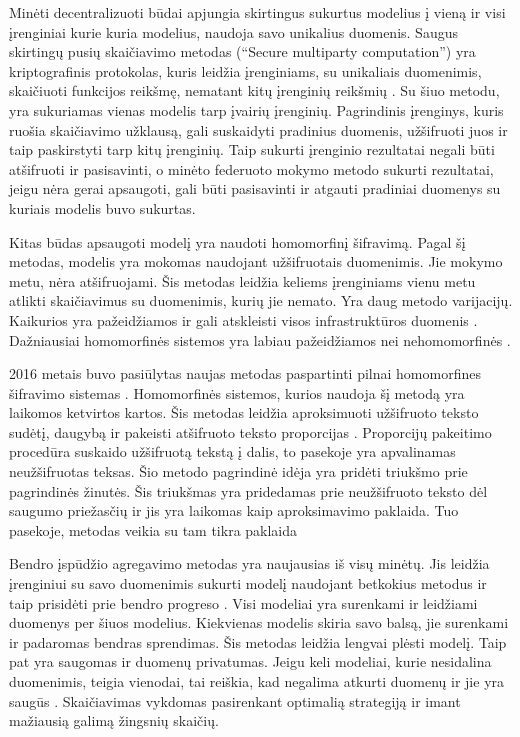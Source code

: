 \documentclass{VUMIFInfBakalaurinis}
\begin{document}
\par Minėti decentralizuoti būdai apjungia skirtingus sukurtus modelius į vieną ir visi įrenginiai kurie kuria modelius, naudoja savo unikalius duomenis. Saugus skirtingų pusių skaičiavimo metodas (\enquote{Secure multiparty computation}) yra kriptografinis protokolas, kuris leidžia įrenginiams, su unikaliais duomenimis, skaičiuoti funkcijos reikšmę, nematant kitų įrenginių reikšmių \cite{6}. Su šiuo metodu, yra sukuriamas vienas modelis tarp įvairių įrenginių. Pagrindinis įrenginys, kuris ruošia skaičiavimo užklausą, gali suskaidyti pradinius duomenis, užšifruoti juos ir taip paskirstyti tarp kitų įrenginių. Taip sukurti įrenginio rezultatai negali būti atšifruoti ir pasisavinti, o minėto federuoto mokymo metodo sukurti rezultatai, jeigu nėra gerai apsaugoti, gali būti pasisavinti ir atgauti pradiniai duomenys su kuriais modelis buvo sukurtas.
\par  Kitas būdas apsaugoti modelį yra naudoti homomorfinį šifravimą. Pagal šį metodas, modelis yra mokomas naudojant užšifruotais duomenimis. Jie mokymo metu, nėra atšifruojami. Šis metodas leidžia keliems įrenginiams vienu metu atlikti skaičiavimus su duomenimis, kurių jie nemato. Yra daug metodo varijacijų. Kaikurios yra pažeidžiamos ir gali atskleisti visos infrastruktūros duomenis \cite{7}. Dažniausiai homomorfinės sistemos yra labiau pažeidžiamos nei nehomomorfinės \cite{7}.
\par 2016 metais buvo pasiūlytas naujas metodas paspartinti pilnai homomorfines šifravimo sistemas \cite{8}. Homomorfinės sistemos, kurios naudoja šį metodą yra laikomos ketvirtos kartos. Šis metodas leidžia aproksimuoti užšifruoto teksto sudėtį, daugybą ir pakeisti atšifruoto teksto proporcijas \cite{8}. 
Proporcijų pakeitimo procedūra suskaido užšifruotą tekstą į dalis, to pasekoje yra apvalinamas neužšifruotas teksas. Šio metodo pagrindinė idėja yra pridėti triukšmo prie pagrindinės žinutės. Šis triukšmas yra pridedamas prie neužšifruoto teksto dėl saugumo priežasčių ir jis yra laikomas kaip aproksimavimo paklaida. Tuo pasekoje, metodas veikia su tam tikra paklaida
\par Bendro įspūdžio agregavimo metodas yra naujausias iš visų minėtų. Jis leidžia įrenginiui su savo duomenimis sukurti modelį naudojant betkokius metodus ir taip prisidėti prie bendro progreso \cite{6}. Visi modeliai yra surenkami ir leidžiami duomenys per šiuos modelius. Kiekvienas modelis skiria savo balsą, jie surenkami ir padaromas bendras sprendimas. Šis metodas leidžia lengvai plėsti modelį. Taip pat yra saugomas ir duomenų privatumas. Jeigu keli modeliai, kurie nesidalina duomenimis, teigia vienodai, tai reiškia, kad negalima atkurti duomenų ir jie yra saugūs \cite{6}. Skaičiavimas vykdomas pasirenkant optimalią strategiją ir imant mažiausią galimą žingsnių skaičių.
\end{document}
